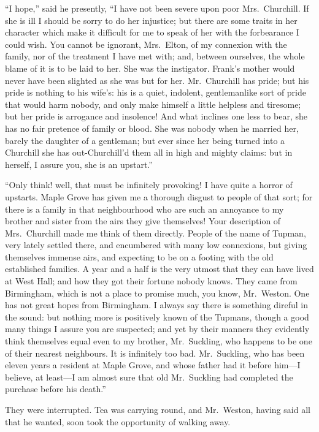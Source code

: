 ``I hope,'' said he presently, ``I have not been severe upon poor
Mrs.\ Churchill.  If she is ill I should be sorry to do her injustice;
but there are some traits in her character which make it difficult
for me to speak of her with the forbearance I could wish.
You cannot be ignorant, Mrs.\ Elton, of my connexion with the family,
nor of the treatment I have met with; and, between ourselves,
the whole blame of it is to be laid to her.  She was the instigator.
Frank's mother would never have been slighted as she was but for her.
Mr.\ Churchill has pride; but his pride is nothing to his wife's:
his is a quiet, indolent, gentlemanlike sort of pride that would
harm nobody, and only make himself a little helpless and tiresome;
but her pride is arrogance and insolence!  And what inclines one less
to bear, she has no fair pretence of family or blood.  She was nobody
when he married her, barely the daughter of a gentleman; but ever
since her being turned into a Churchill she has out-Churchill'd them
all in high and mighty claims:  but in herself, I assure you, she is
an upstart.''

``Only think! well, that must be infinitely provoking!  I have quite
a horror of upstarts.  Maple Grove has given me a thorough disgust
to people of that sort; for there is a family in that neighbourhood
who are such an annoyance to my brother and sister from the airs
they give themselves!  Your description of Mrs.\ Churchill made me
think of them directly.  People of the name of Tupman, very lately
settled there, and encumbered with many low connexions, but giving
themselves immense airs, and expecting to be on a footing with the old
established families.  A year and a half is the very utmost that they can
have lived at West Hall; and how they got their fortune nobody knows.
They came from Birmingham, which is not a place to promise much,
you know, Mr.\ Weston.  One has not great hopes from Birmingham.
I always say there is something direful in the sound:  but nothing
more is positively known of the Tupmans, though a good many things
I assure you are suspected; and yet by their manners they evidently
think themselves equal even to my brother, Mr.\ Suckling, who happens
to be one of their nearest neighbours.  It is infinitely too bad.
Mr.\ Suckling, who has been eleven years a resident at Maple Grove,
and whose father had it before him---I believe, at least---I am
almost sure that old Mr.\ Suckling had completed the purchase before
his death.''

They were interrupted.  Tea was carrying round, and Mr.\ Weston,
having said all that he wanted, soon took the opportunity of
walking away.

